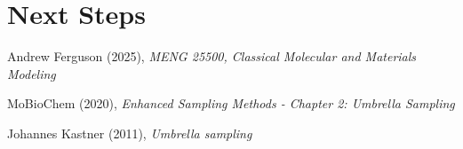 \documentclass{article}
\begin{document}
\section{Next Steps}


\begin{thebibliography}{9}

Andrew Ferguson (2025), \emph{MENG 25500, Classical Molecular and Materials Modeling}

MoBioChem (2020), \emph{Enhanced Sampling Methods - Chapter 2: Umbrella Sampling}

Johannes Kastner (2011), \emph{Umbrella sampling}

\end{thebibliography}
\end{document}
